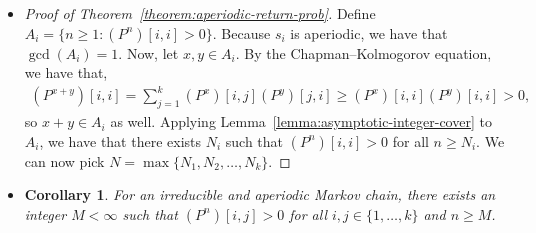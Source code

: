 \documentclass[10pt]{article}
\newtheorem{corollary}[lemma]{Corollary}
\newcommand{\mrm}[1]{\mathrm{#1}}
\begin{document}
\begin{itemize}
\begin{proof}
    Because $\mrm{gcd}\{a_1, a_2, \dotsc, a_m\} = 1$, we can find $c_1, c_2, \dotsc, c_m \in \mathbb{Z}$, some of which may not be positive, such that
    \begin{align*}
        c_1 a_1 + c_2 a_2 + \dotsb + c_m a_m = 1.
    \end{align*}
    Now, we pick
    \begin{align*}
        N := a_1 \sum_{i=1}^m |c_i| a_i.
    \end{align*}        
    We will now show that $n \in A$ for any $n \geq N$. To do this, we will first show that $N$, $N+1$, $N+2$, $\dotsc$, $N+a_1-1$ are all members of $A$. So, let's consider $N+r$ where $0 \leq r < a_1$. We have that
    \begin{align*}
        N + r 
        &= a_1 \sum_{i=1}^m |c_i| a_i + r\bigg( \sum_{i=1}^m c_i a_i \bigg) 
        = \sum_{i=1}^m (a_1|c_i| + rc_i) a_i.
    \end{align*}
    Note that
    \begin{align*}
    a_1 |c_i| + r c_i \geq a_1 |c_i| - r |c_i| = (a_1 - r) |c_i| \geq |c_i| \geq 0.
    \end{align*}
    As a result, $N+r \in A$ because it can be written as a linear combination of $a_1$, $a_2$, $\dotsc$, $a_m$ with non-negative coefficients. 

    Lastly, we have that, for any $n \geq N + a_1$, we can find $c \geq 1$ and $0 \leq r < a_1$ such that $n = N + r + ca_1$. Because $N + r \in A$ and $ca_1 \in A$, we have that $n \in A$ as well.
  \end{proof}

  \item \begin{proof}[Proof of Theorem~\ref{theorem:aperiodic-return-prob}] Define $A_i = \{ n \geq 1: (P^n)[i,i] > 0 \}$. Because $s_i$ is aperiodic, we have that $\gcd(A_i) = 1$. Now, let $x,y \in A_i$. By the Chapman--Kolmogorov equation, we have that,
    \begin{align*}
        (P^{x+y})[i,i] = \sum_{j=1}^k (P^x)[i,j] (P^y)[j,i] \geq (P^x)[i,i] (P^y)[i,i] > 0,
    \end{align*}
    so $x + y \in A_i$ as well. Applying Lemma~\ref{lemma:asymptotic-integer-cover} to $A_i$, we have that there exists $N_i$ such that $(P^n)[i,i] > 0$ for all $n \geq N_i$. We can now pick $N = \max\{ N_1, N_2, \dotsc, N_k \}$.
  \end{proof}

  \item \begin{corollary} \label{corollary:apriodic-irreducible-hitting-prob}
    For an irreducible and aperiodic Markov chain, there exists an integer $M < \infty$ such that $(P^n)[i,j] > 0$ for all $i,j \in \{1,\dotsc,k\}$ and $n \geq M$.
  \end{corollary}
\end{itemize}
\end{document}

